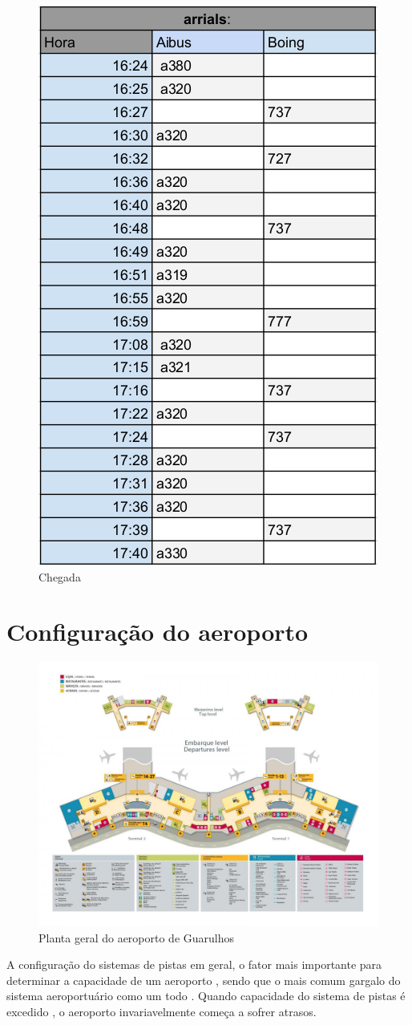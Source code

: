 \documentclass[12pt]{article}
\begin{document}
\begin{figure}[h!]
  \centering
  \includegraphics[width=.3\textwidth]{aterrisagem.png}
  \caption{Chegada}
  \label{fig:chegando}
\end{figure}



\section{Configuração do aeroporto}

\begin{figure}[b!]
  \centering
  \includegraphics[width=.9\textwidth]{aeroporto.png}
  \caption{Planta geral do aeroporto de Guarulhos}
  \label{fig:aeropoto}
\end{figure}

A configuração do sistemas de pistas em geral, o fator mais importante
para determinar a capacidade de um aeroporto , sendo que o mais comum 
gargalo do sistema aeroportuário como um todo . Quando capacidade do 
sistema de pistas é excedido , o aeroporto invariavelmente começa a 
sofrer atrasos.
\end{document}
